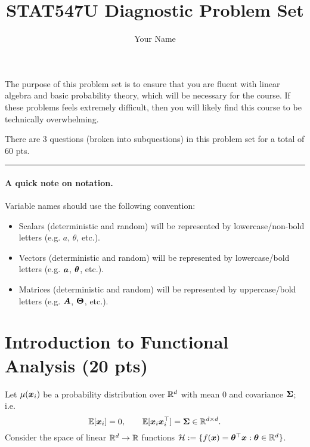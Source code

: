 \documentclass[11pt,letterpaper]{article}
\title{STAT547U Diagnostic Problem Set}
\author{Your Name}  %
\newcommand{\sectionbreak}{%
  \vspace{1em}
  \hrule
}
\newcommand{\doccolor}{gray}
\newcommand{\doccolor}{black}
\begin{document}
\maketitle

\color{\doccolor}
The purpose of this problem set is to ensure that you are fluent with linear algebra and basic probability theory,
which will be necessary for the course.
If these problems feels extremely difficult, then you will likely find this course to be technically overwhelming.

There are 3 questions (broken into subquestions) in this problem set for a total of 60 pts.

\sectionbreak

\paragraph{A quick note on notation.}
Variable names should use the following convention:
\begin{itemize}
  \item Scalars (deterministic and random) will be represented by lowercase/non-bold letters (e.g. $a$, $\theta$, etc.).
  \item Vectors (deterministic and random) will be represented by lowercase/bold letters (e.g. ${\bm{a}}$, ${\bm{\theta}}$, etc.).
  \item Matrices (deterministic and random) will be represented by uppercase/bold letters (e.g. ${\bm{A}}$, ${\bm{\Theta}}$, etc.).
\end{itemize}



\section{Introduction to Functional Analysis (20 pts)}

Let $\mu({\bm{x}}_i)$ be a probability distribution over $\mathbb{R}^d$ with mean 0 and covariance ${\bm{\Sigma}}$; i.e.
%
$$\mathbb{E}[{\bm{x}}_i] = 0, \qquad \mathbb{E}[{\bm{x}}_i {\bm{x}}_i^\top] = {\bm{\Sigma}} \in \mathbb{R}^{d \times d}. $$
%
Consider the space of linear $\mathbb{R}^d \to \mathbb{R}$ functions $\mathcal{H} := \{ f({\bm{x}}) = {\bm{\theta}}^\top {\bm{x}} : {\bm{\theta}} \in \mathbb{R}^d \}$.
\end{document}
